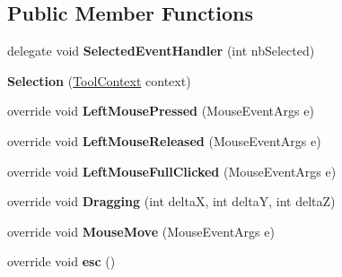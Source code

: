\subsection*{Public Member Functions}
\begin{DoxyCompactItemize}
\item 
\hypertarget{class_interface_graphique_1_1_tools_1_1_selection_ad4434ee0c7fcc7944d17043745522582}{}delegate void {\bfseries Selected\+Event\+Handler} (int nb\+Selected)\label{class_interface_graphique_1_1_tools_1_1_selection_ad4434ee0c7fcc7944d17043745522582}

\item 
\hypertarget{class_interface_graphique_1_1_tools_1_1_selection_a3d0221ef021627d29bb02cc8ae28653a}{}{\bfseries Selection} (\hyperlink{class_interface_graphique_1_1_tools_1_1_tool_context}{Tool\+Context} context)\label{class_interface_graphique_1_1_tools_1_1_selection_a3d0221ef021627d29bb02cc8ae28653a}

\item 
\hypertarget{class_interface_graphique_1_1_tools_1_1_selection_acd046c5e27da4c8b720816a23aa72ff7}{}override void {\bfseries Left\+Mouse\+Pressed} (Mouse\+Event\+Args e)\label{class_interface_graphique_1_1_tools_1_1_selection_acd046c5e27da4c8b720816a23aa72ff7}

\item 
\hypertarget{class_interface_graphique_1_1_tools_1_1_selection_af1083f7026a963a718a9835e79e541b3}{}override void {\bfseries Left\+Mouse\+Released} (Mouse\+Event\+Args e)\label{class_interface_graphique_1_1_tools_1_1_selection_af1083f7026a963a718a9835e79e541b3}

\item 
\hypertarget{class_interface_graphique_1_1_tools_1_1_selection_aef3afc03446b9419f0e664ac541b15de}{}override void {\bfseries Left\+Mouse\+Full\+Clicked} (Mouse\+Event\+Args e)\label{class_interface_graphique_1_1_tools_1_1_selection_aef3afc03446b9419f0e664ac541b15de}

\item 
\hypertarget{class_interface_graphique_1_1_tools_1_1_selection_ab88a610b3d7e5fb3e37386e0553ee30a}{}override void {\bfseries Dragging} (int delta\+X, int delta\+Y, int delta\+Z)\label{class_interface_graphique_1_1_tools_1_1_selection_ab88a610b3d7e5fb3e37386e0553ee30a}

\item 
\hypertarget{class_interface_graphique_1_1_tools_1_1_selection_a1b44917e1b656fcebe00ce72c77dbc65}{}override void {\bfseries Mouse\+Move} (Mouse\+Event\+Args e)\label{class_interface_graphique_1_1_tools_1_1_selection_a1b44917e1b656fcebe00ce72c77dbc65}

\item 
\hypertarget{class_interface_graphique_1_1_tools_1_1_selection_ab825bb5bc10507fa0e3c653f9d0ce193}{}override void {\bfseries esc} ()\label{class_interface_graphique_1_1_tools_1_1_selection_ab825bb5bc10507fa0e3c653f9d0ce193}

\end{DoxyCompactItemize}
